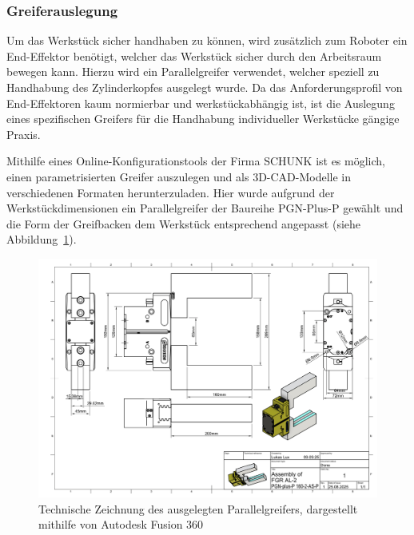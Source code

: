 \subsubsection{Greiferauslegung}

Um das Werkstück sicher handhaben zu können, wird zusätzlich zum Roboter
ein End-Effektor benötigt, welcher das Werkstück sicher durch den Arbeitsraum
bewegen kann. Hierzu wird ein Parallelgreifer verwendet, welcher speziell zu
Handhabung des Zylinderkopfes ausgelegt wurde.
Da das Anforderungsprofil von End-Effektoren kaum normierbar und
werkstückabhängig ist, ist die Auslegung eines
spezifischen Greifers für die Handhabung individueller Werkstücke gängige
Praxis.

Mithilfe eines Online-Konfigurationstools der Firma
SCHUNK ist es möglich, einen parametrisierten
Greifer auszulegen und als
3D-CAD-Modelle in verschiedenen Formaten herunterzuladen. Hier wurde
aufgrund der
Werkstückdimensionen ein Parallelgreifer der Baureihe PGN-Plus-P gewählt und die
Form der Greifbacken dem Werkstück entsprechend angepasst (siehe
Abbildung~\ref{figure:schunkGripper}).

\begin{figure}[H]
  \centering
  \includegraphics[width=\linewidth]{Figures/SchunkGreifer-1.png}
  \caption{Technische Zeichnung des ausgelegten Parallelgreifers, dargestellt
  mithilfe von Autodesk Fusion 360}
  \label{figure:schunkGripper}
\end{figure}

